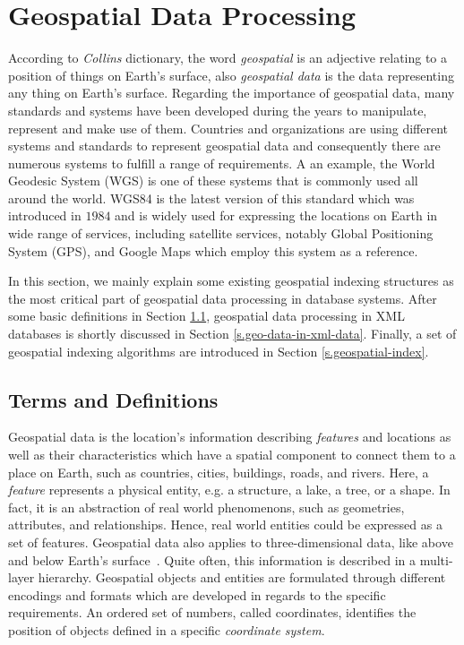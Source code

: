 \documentclass[a4paper,12pt]{article}
\begin{document}
\newpage
\section{Geospatial Data Processing}
\label{s.method}
According to \emph{Collins} dictionary, the word \emph{geospatial} is an adjective relating to a position of things on Earth's surface, also \emph{geospatial data} is the data representing any thing on Earth's surface. Regarding the importance of geospatial data, many standards and systems have been developed  during the years to manipulate, represent and make use of them. Countries and organizations are using different systems and standards to represent geospatial data and consequently there are numerous systems to fulfill a range of requirements. A an example, the World Geodesic System (WGS) is one of these systems that is commonly used all around the world. WGS84 is the latest version of this standard which
was introduced in $1984$ and is widely used for expressing the locations on Earth in wide range of services, including satellite services, notably Global Positioning System (GPS), and Google Maps which employ this system as a reference.

In this section, we mainly explain some existing geospatial indexing structures as the most critical part of geospatial data processing in database systems. After some basic definitions in Section \ref{termsanddef}, geospatial data processing in XML~\cite{www/xml} databases is shortly discussed in Section \ref{s.geo-data-in-xml-data}.
Finally, a set of geospatial indexing algorithms are introduced in Section \ref{s.geospatial-index}.

\subsection{Terms and Definitions}
\label{termsanddef}
Geospatial data is the location's information describing \textit{features} and locations as well as their characteristics which have a spatial component to connect them to a place on Earth, such as countries, cities, buildings, roads, and rivers. Here, a \textit{feature} represents a physical entity, e.g. a structure, a lake, a tree, or a shape. In fact, it is an abstraction of real world phenomenons, such as geometries, attributes, and relationships. Hence, real world entities could be expressed as a set of features.
Geospatial data also applies to three-dimensional data, like above and below Earth's surface~\cite{powell}. Quite often, this information is described in a multi-layer hierarchy. Geospatial objects and entities are formulated through different encodings and formats which are developed in regards to the specific requirements. An ordered set of numbers, called coordinates, identifies the position of objects  defined in a specific \textit{coordinate system}. 
\end{document}
